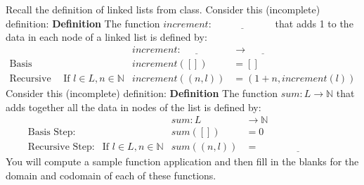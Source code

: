\documentclass[12pt, oneside]{article}
\begin{document}
\begin{flushright}
\end{flushright}Recall the definition of linked lists from class.
Consider this (incomplete) definition:
{\bf Definition} The function $\textit{increment} : \underline{\hspace{6em}}$ 
that adds 1 to the data in each node of a linked list is defined by:
\[
\begin{array}{llll}
& & \textit{increment} : \underline{\hspace{3em}} & \to \underline{\hspace{3em}} \\
\textrm{Basis Step:} & & \textit{increment}([]) & = [] \\
\textrm{Recursive Step:} & \textrm{If } l \in L, n \in \mathbb{N} & \textit{increment}((n, l)) & = (1 + n, \textit{increment}(l))
\end{array}
\]
Consider this (incomplete) definition:
{\bf Definition} The function $\textit{sum} : L \to \mathbb{N}$ that adds 
together all the data in nodes of the list is defined by:
\[
\begin{array}{llll}
& & \textit{sum} : L & \to \mathbb{N} \\
\textrm{Basis Step:} & & \textit{sum}([]) & = 0 \\
\textrm{Recursive Step:} & \textrm{If } l \in L, n \in \mathbb{N} & \textit{sum}((n, l)) & = \underline{\hspace{8em}}
\end{array}
\]
You will compute a sample function application and then fill in the 
blanks for the domain and codomain of each of these functions.
\end{document}
